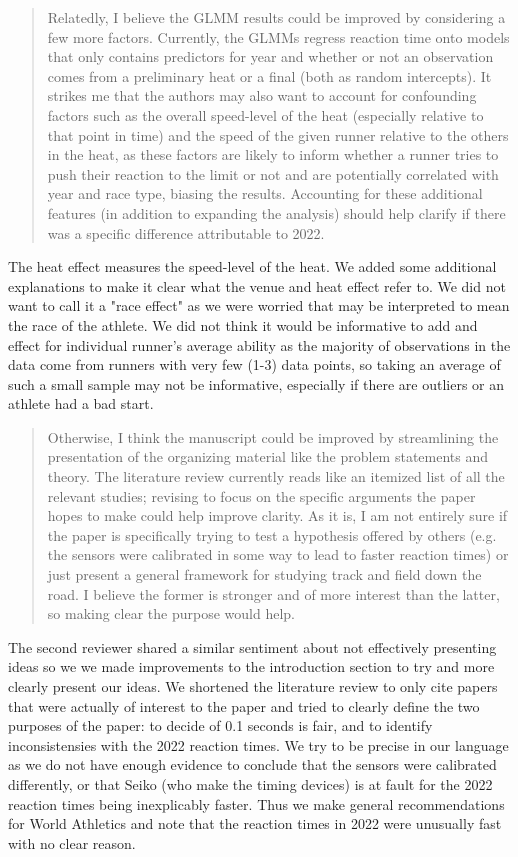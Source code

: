 \documentclass[12pt]{article}
\newenvironment{comment}%
{\begin{quotation}\noindent\small\it\color{darkblue}\ignorespaces%
}{\end{quotation}}
\begin{document}
\begin{comment}
Relatedly, I believe the GLMM results could be improved by considering a few
more factors. Currently, the GLMMs regress reaction time onto models that only
contains predictors for year and whether or not an observation comes from a
preliminary heat or a final (both as random intercepts). It strikes me that the
authors may also want to account for confounding factors such as the overall
speed-level of the heat (especially relative to that point in time) and the
speed of the given runner relative to the others in the heat, as these factors
are likely to inform whether a runner tries to push their reaction to the limit
or not and are potentially correlated with year and race type, biasing the
results. Accounting for these additional features (in addition to expanding the
analysis) should help clarify if there was a specific difference attributable to
2022.
\end{comment} 


The heat effect measures the speed-level of the heat.  We added some additional
explanations to make it clear what the venue and heat effect refer to. We did
not want to call it a "race effect" as we were worried that may be interpreted
to mean the race of the athlete.  We did not think it would be informative to 
add and effect for individual runner's average ability as the majority of
observations in the data come from runners with very few (1-3) data points,
so taking an average of such a small sample may not be informative, especially
if there are outliers or an athlete had a bad start.


\begin{comment}
Otherwise, I think the manuscript could be improved by streamlining the
presentation of the organizing material like the problem statements and theory.
The literature review currently reads like an itemized list of all the relevant
studies; revising to focus on the specific arguments the paper hopes to make
could help improve clarity. As it is, I am not entirely sure if the paper is
specifically trying to test a hypothesis offered by others (e.g. the sensors
were calibrated in some way to lead to faster reaction times) or just present a
general framework for studying track and field down the road. I believe the
former is stronger and of more interest than the latter, so making clear the
purpose would help.

\end{comment}  
The second reviewer shared a similar sentiment about not effectively
presenting ideas so we we made improvements to the introduction section to try
and more clearly present our ideas.  We shortened the literature review to only
cite papers that were actually of interest to the paper and tried to clearly
define the two purposes of the paper: to decide of 0.1 seconds is fair, and to
identify inconsistensies with the 2022 reaction times. We try to be precise in
our language as we do not have enough evidence to conclude that the sensors were
calibrated differently, or that Seiko (who make the timing devices) is at fault
for the 2022 reaction times being inexplicably faster. Thus we make general
recommendations for World Athletics and note that the reaction times in 2022
were unusually fast with no clear reason.
\end{document}

